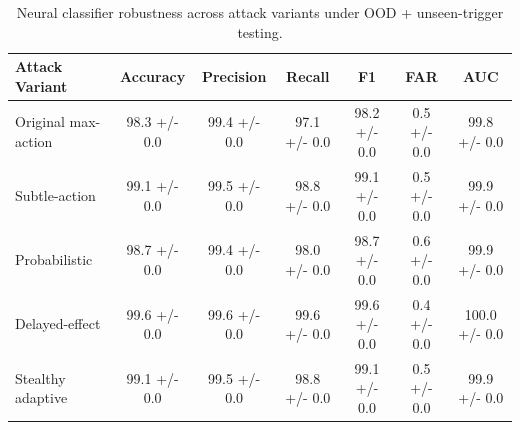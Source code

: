 \begin{table}[t]
\centering
\begin{tabular}{lcccccc}
\hline
Attack Variant & Accuracy & Precision & Recall & F1 & FAR & AUC \\
\hline
Original max-action & 98.3 +/- 0.0 & 99.4 +/- 0.0 & 97.1 +/- 0.0 & 98.2 +/- 0.0 & 0.5 +/- 0.0 & 99.8 +/- 0.0 \\
Subtle-action & 99.1 +/- 0.0 & 99.5 +/- 0.0 & 98.8 +/- 0.0 & 99.1 +/- 0.0 & 0.5 +/- 0.0 & 99.9 +/- 0.0 \\
Probabilistic & 98.7 +/- 0.0 & 99.4 +/- 0.0 & 98.0 +/- 0.0 & 98.7 +/- 0.0 & 0.6 +/- 0.0 & 99.9 +/- 0.0 \\
Delayed-effect & 99.6 +/- 0.0 & 99.6 +/- 0.0 & 99.6 +/- 0.0 & 99.6 +/- 0.0 & 0.4 +/- 0.0 & 100.0 +/- 0.0 \\
Stealthy adaptive & 99.1 +/- 0.0 & 99.5 +/- 0.0 & 98.8 +/- 0.0 & 99.1 +/- 0.0 & 0.5 +/- 0.0 & 99.9 +/- 0.0 \\
\hline
\end{tabular}
\caption{Neural classifier robustness across attack variants under OOD + unseen-trigger testing.}
\label{tab:attack_variant_robustness}
\end{table}
